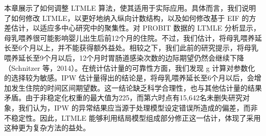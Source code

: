 本章展示了如何调整 LTMLE 算法，使其适用于实际应用。具体而言，我们说明了如何修改 LTMLE，以更好地纳入纵向计数结构，以及如何修改基于 EIF 的方差估计，以适应多中心研究中的聚集性。对 PROBIT 数据的 LTMLE 分析显示，母乳喂养很可能影响婴儿出生后前12个月的住院。不过，我们估计，将母乳喂养延长至6个月以上，并不能获得额外益处。相较之下，我们此前的研究提示，将母乳喂养延长至9个月以后，12个月时胃肠道感染次数的边际期望仍然会继续下降（Schnitzer 等，2014）。在统计估计量的可靠性方面，我们发现 g 计算对参数化的选择较为敏感。IPW 估计量得出的结论是，将母乳喂养延长至6个月以后，会增加发生住院的时间区间期望数。这一结论缺乏科学合理性，也与其他估计量的结果矛盾。由于非稳定化权重的最大值为225，而第六时点有15,642名未删失研究对象，我们认为，IPW 的异常结果应当源于处理模型设定错误所造成的偏差，而非不稳定性。因此，LTMLE 能够利用结局模型组成部分修正这一估计，体现了采用这种更为复杂方法的益处。
\clearpage
\endgroup
